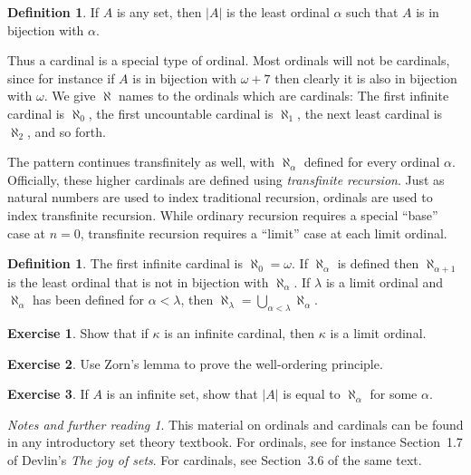 \documentclass[11pt,oneside]{amsbook}
\theoremstyle{definition}
\newtheorem{exerc}{Exercise}[section]
\theoremstyle{plain}
\theoremstyle{definition}
\newtheorem{defn}[thm]{Definition}
\theoremstyle{remark}
\newtheorem*{notes}{Notes and further reading}
\numberwithin{equation}{section}
\numberwithin{figure}{section}
\begin{document}
\begin{defn}
  If $A$ is any set, then $|A|$ is the least ordinal $\alpha$ such that $A$ is in bijection with $\alpha$.
\end{defn}

Thus a cardinal is a special type of ordinal. Most ordinals will not be cardinals, since for instance if $A$ is in bijection with $\omega+7$ then clearly it is also in bijection with $\omega$. We give $\aleph$ names to the ordinals which are cardinals: The first infinite cardinal is $\aleph_0$, the first uncountable cardinal is $\aleph_1$, the next least cardinal is $\aleph_2$, and so forth.

The pattern continues transfinitely as well, with $\aleph_\alpha$ defined for every ordinal $\alpha$. Officially, these higher cardinals are defined using \emph{transfinite recursion}. Just as natural numbers are used to index traditional recursion, ordinals are used to index transfinite recursion. While ordinary recursion requires a special ``base'' case at $n=0$, transfinite recursion requires a ``limit'' case at each limit ordinal.

\begin{defn}
  The first infinite cardinal is $\aleph_0=\omega$. If $\aleph_\alpha$ is defined then $\aleph_{\alpha+1}$ is the least ordinal that is not in bijection with $\aleph_\alpha$. If $\lambda$ is a limit ordinal and $\aleph_\alpha$ has been defined for $\alpha<\lambda$, then $\aleph_\lambda=\bigcup_{\alpha<\lambda}\aleph_\alpha$.
\end{defn}


\begin{exerc}
  Show that if $\kappa$ is an infinite cardinal, then $\kappa$ is a limit ordinal.
\end{exerc}

\begin{exerc}
  Use Zorn's lemma to prove the well-ordering principle.
\end{exerc}

\begin{exerc}
  If $A$ is an infinite set, show that $|A|$ is equal to $\aleph_\alpha$ for some $\alpha$.
\end{exerc}

\begin{notes}
  This material on ordinals and cardinals can be found in any introductory set theory textbook. For ordinals, see for instance Section~1.7 of Devlin's \emph{The joy of sets}. For cardinals, see Section~3.6 of the same text.
\end{notes}
\end{document}
